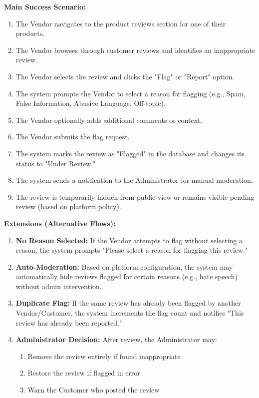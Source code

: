 \textbf{Main Success Scenario:}
\begin{enumerate}
    \item The Vendor navigates to the product reviews section for one of their products.
    \item The Vendor browses through customer reviews and identifies an inappropriate review.
    \item The Vendor selects the review and clicks the "Flag" or "Report" option.
    \item The system prompts the Vendor to select a reason for flagging (e.g., Spam, False Information, Abusive Language, Off-topic).
    \item The Vendor optionally adds additional comments or context.
    \item The Vendor submits the flag request.
    \item The system marks the review as "Flagged" in the database and changes its status to "Under Review."
    \item The system sends a notification to the Administrator for manual moderation.
    \item The review is temporarily hidden from public view or remains visible pending review (based on platform policy).
\end{enumerate}

\textbf{Extensions (Alternative Flows):}
\begin{enumerate}
    \item[4a.] \textbf{No Reason Selected:} If the Vendor attempts to flag without selecting a reason, the system prompts "Please select a reason for flagging this review."
    
    \item[7a.] \textbf{Auto-Moderation:} Based on platform configuration, the system may automatically hide reviews flagged for certain reasons (e.g., hate speech) without admin intervention.
    
    \item[8a.] \textbf{Duplicate Flag:} If the same review has already been flagged by another Vendor/Customer, the system increments the flag count and notifies "This review has already been reported."
    
    \item[9a.] \textbf{Administrator Decision:} After review, the Administrator may:
    \begin{enumerate}
        \item Remove the review entirely if found inappropriate
        \item Restore the review if flagged in error
        \item Warn the Customer who posted the review
    \end{enumerate}
\end{enumerate}

